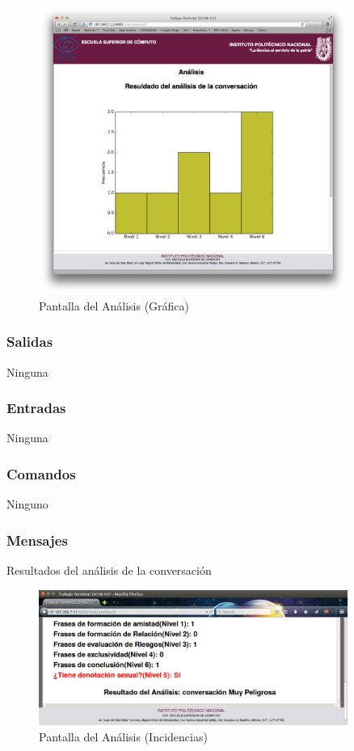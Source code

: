 	\begin{figure}[htbp!]
		\centering
			\includegraphics[width=0.9\textwidth]{images/Modulo1/GraficaAnalisis}
		\caption{Pantalla del An\'alisis (Gr\'afica)}
	\end{figure}

\subsubsection{Salidas}
Ninguna


\subsubsection{Entradas}
Ninguna
\subsubsection{Comandos}
Ninguno
\subsubsection{Mensajes}
Resultados del an\'alisis de la conversaci\'on 

\begin{figure}[htbp!]
		\centering
			\includegraphics[width=0.9\textwidth]{images/Modulo1/InsidenciasNivel}
		\caption{Pantalla del An\'alisis (Incidencias)}
	\end{figure}



	\pagebreak%

